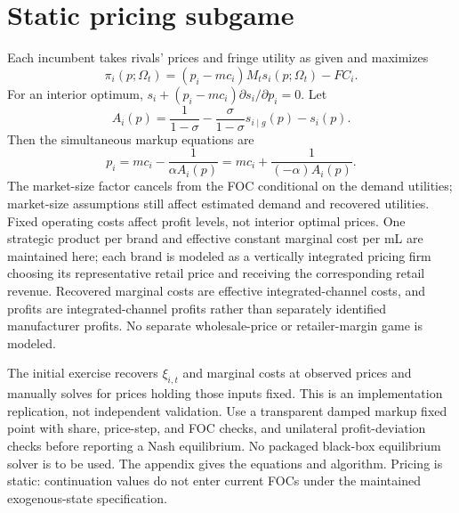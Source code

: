 \documentclass[11pt]{article}
\begin{document}
\section{Static pricing subgame}
Each incumbent takes rivals' prices and fringe utility as given and maximizes
\begin{equation}
\pi_i(p;\Omega_t)=(p_i-mc_i)M_ts_i(p;\Omega_t)-FC_i.
\end{equation}
For an interior optimum, $s_i+(p_i-mc_i)\partial s_i/\partial p_i=0$. Let
\[
A_i(p)=\frac{1}{1-\sigma}-\frac{\sigma}{1-\sigma}s_{i\mid g}(p)-s_i(p).
\]
Then the simultaneous markup equations are
\begin{equation}
p_i=mc_i-\frac{1}{\alpha A_i(p)}=mc_i+\frac{1}{(-\alpha)A_i(p)}.
\end{equation}
The market-size factor cancels from the FOC conditional on the demand utilities; market-size assumptions still affect estimated demand and recovered utilities. Fixed operating costs affect profit levels, not interior optimal prices. One strategic product per brand and effective constant marginal cost per mL are maintained here; each brand is modeled as a vertically integrated pricing firm choosing its representative retail price and receiving the corresponding retail revenue. Recovered marginal costs are effective integrated-channel costs, and profits are integrated-channel profits rather than separately identified manufacturer profits. No separate wholesale-price or retailer-margin game is modeled.

The initial exercise recovers $\xi_{i,t}$ and marginal costs at observed prices and manually solves for prices holding those inputs fixed. This is an implementation replication, not independent validation. Use a transparent damped markup fixed point with share, price-step, and FOC checks, and unilateral profit-deviation checks before reporting a Nash equilibrium. No packaged black-box equilibrium solver is to be used. The appendix gives the equations and algorithm. Pricing is static: continuation values do not enter current FOCs under the maintained exogenous-state specification.
\end{document}
